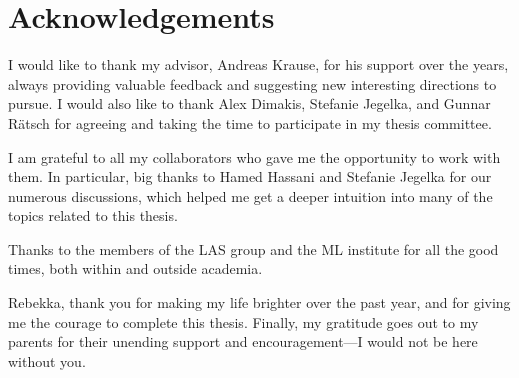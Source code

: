 \cleardoublepage
\section*{\centering Acknowledgements}
\vspace{1em}
I would like to thank my advisor, Andreas Krause, for his support over the years, always providing valuable feedback and suggesting new interesting directions to pursue.
I would also like to thank Alex Dimakis, Stefanie Jegelka, and Gunnar Rätsch for agreeing and taking the time to participate in my thesis committee.

I am grateful to all my collaborators who gave me the opportunity to work with them.
In particular, big thanks to Hamed Hassani and Stefanie Jegelka for our numerous discussions, which helped me get a deeper intuition into many of the topics related to this thesis.

Thanks to the members of the LAS group and the ML institute for all the good times, both within and outside academia.

Rebekka, thank you for making my life brighter over the past year, and for giving me the courage to complete this thesis.
Finally, my gratitude goes out to my parents for their unending support and encouragement---I would not be here without you.